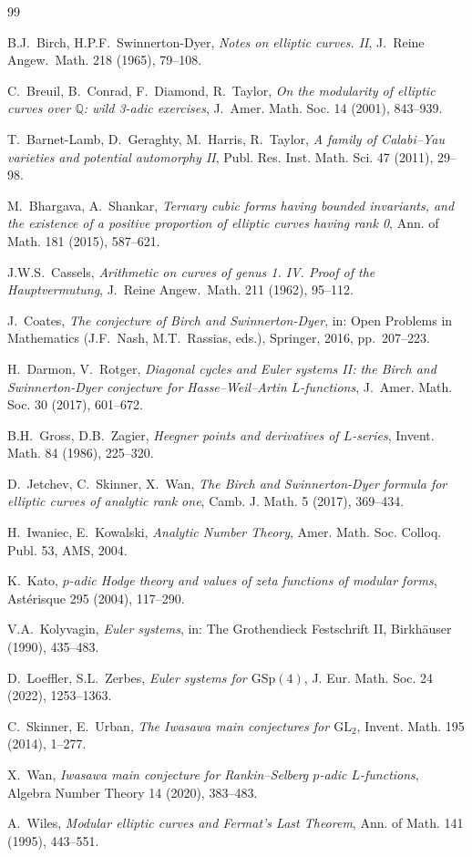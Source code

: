 \documentclass[11pt]{article}
\begin{document}
\begin{thebibliography}{99}

B.J.~Birch, H.P.F.~Swinnerton-Dyer,
\textit{Notes on elliptic curves. II},
J.~Reine Angew.~Math. 218 (1965), 79--108.

C.~Breuil, B.~Conrad, F.~Diamond, R.~Taylor,
\textit{On the modularity of elliptic curves over $\mathbb{Q}$:
wild 3-adic exercises},
J.~Amer. Math. Soc. 14 (2001), 843--939.

T.~Barnet-Lamb, D.~Geraghty, M.~Harris, R.~Taylor,
\textit{A family of Calabi--Yau varieties and potential automorphy II},
Publ. Res. Inst. Math. Sci. 47 (2011), 29--98.

M.~Bhargava, A.~Shankar,
\textit{Ternary cubic forms having bounded invariants, and the existence
of a positive proportion of elliptic curves having rank 0},
Ann. of Math. 181 (2015), 587--621.

J.W.S.~Cassels,
\textit{Arithmetic on curves of genus 1. IV. Proof of the
Hauptvermutung},
J.~Reine Angew.~Math. 211 (1962), 95--112.

J.~Coates,
\textit{The conjecture of Birch and Swinnerton-Dyer},
in: Open Problems in Mathematics (J.F.~Nash, M.T.~Rassias, eds.),
Springer, 2016, pp.~207--223.

H.~Darmon, V.~Rotger,
\textit{Diagonal cycles and Euler systems II: the Birch and
Swinnerton-Dyer conjecture for Hasse--Weil--Artin $L$-functions},
J.~Amer. Math. Soc. 30 (2017), 601--672.

B.H.~Gross, D.B.~Zagier,
\textit{Heegner points and derivatives of $L$-series},
Invent. Math. 84 (1986), 225--320.

D.~Jetchev, C.~Skinner, X.~Wan,
\textit{The Birch and Swinnerton-Dyer formula for elliptic curves of analytic
rank one},
Camb. J. Math. 5 (2017), 369--434.

H.~Iwaniec, E.~Kowalski,
\textit{Analytic Number Theory},
Amer. Math. Soc. Colloq. Publ. 53, AMS, 2004.

K.~Kato,
\textit{$p$-adic Hodge theory and values of zeta functions of modular
forms},
Ast\'erisque 295 (2004), 117--290.

V.A.~Kolyvagin,
\textit{Euler systems},
in: The Grothendieck Festschrift II,
Birkh\"auser (1990), 435--483.

D.~Loeffler, S.L.~Zerbes,
\textit{Euler systems for $\mathrm{GSp}(4)$},
J. Eur. Math. Soc. 24 (2022), 1253--1363.

C.~Skinner, E.~Urban,
\textit{The Iwasawa main conjectures for $\mathrm{GL}_2$},
Invent. Math. 195 (2014), 1--277.

X.~Wan,
\textit{Iwasawa main conjecture for Rankin--Selberg $p$-adic
$L$-functions},
Algebra Number Theory 14 (2020), 383--483.

A.~Wiles,
\textit{Modular elliptic curves and Fermat's Last Theorem},
Ann. of Math. 141 (1995), 443--551.

\end{thebibliography}
\end{document}
